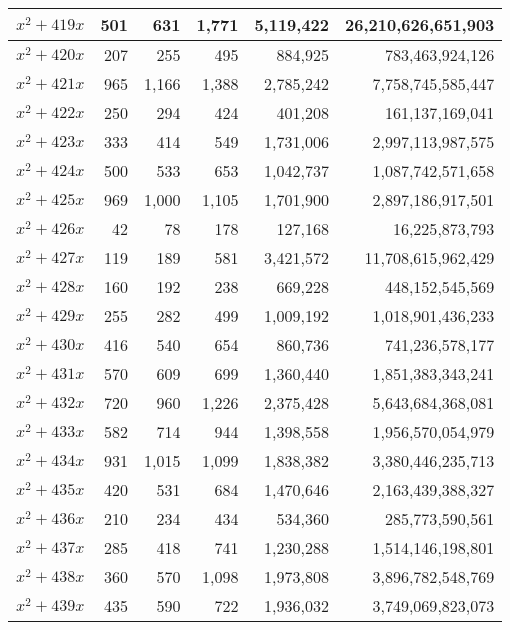 \documentclass[a4paper]{amsproc}
\theoremstyle{plain}
\begin{document}
\begin{longtable}{ | l | r | r | r | r | r | }
$x^2 + 419x$ & 501 & 631 & 1{,}771 & 5{,}119{,}422 & 26{,}210{,}626{,}651{,}903 \\ \hline
$x^2 + 420x$ & 207 & 255 & 495 & 884{,}925 & 783{,}463{,}924{,}126 \\ \hline
$x^2 + 421x$ & 965 & 1{,}166 & 1{,}388 & 2{,}785{,}242 & 7{,}758{,}745{,}585{,}447 \\ \hline
$x^2 + 422x$ & 250 & 294 & 424 & 401{,}208 & 161{,}137{,}169{,}041 \\ \hline
$x^2 + 423x$ & 333 & 414 & 549 & 1{,}731{,}006 & 2{,}997{,}113{,}987{,}575 \\ \hline
$x^2 + 424x$ & 500 & 533 & 653 & 1{,}042{,}737 & 1{,}087{,}742{,}571{,}658 \\ \hline
$x^2 + 425x$ & 969 & 1{,}000 & 1{,}105 & 1{,}701{,}900 & 2{,}897{,}186{,}917{,}501 \\ \hline
$x^2 + 426x$ & 42 & 78 & 178 & 127{,}168 & 16{,}225{,}873{,}793 \\ \hline
$x^2 + 427x$ & 119 & 189 & 581 & 3{,}421{,}572 & 11{,}708{,}615{,}962{,}429 \\ \hline
$x^2 + 428x$ & 160 & 192 & 238 & 669{,}228 & 448{,}152{,}545{,}569 \\ \hline
$x^2 + 429x$ & 255 & 282 & 499 & 1{,}009{,}192 & 1{,}018{,}901{,}436{,}233 \\ \hline
$x^2 + 430x$ & 416 & 540 & 654 & 860{,}736 & 741{,}236{,}578{,}177 \\ \hline
$x^2 + 431x$ & 570 & 609 & 699 & 1{,}360{,}440 & 1{,}851{,}383{,}343{,}241 \\ \hline
$x^2 + 432x$ & 720 & 960 & 1{,}226 & 2{,}375{,}428 & 5{,}643{,}684{,}368{,}081 \\ \hline
$x^2 + 433x$ & 582 & 714 & 944 & 1{,}398{,}558 & 1{,}956{,}570{,}054{,}979 \\ \hline
$x^2 + 434x$ & 931 & 1{,}015 & 1{,}099 & 1{,}838{,}382 & 3{,}380{,}446{,}235{,}713 \\ \hline
$x^2 + 435x$ & 420 & 531 & 684 & 1{,}470{,}646 & 2{,}163{,}439{,}388{,}327 \\ \hline
$x^2 + 436x$ & 210 & 234 & 434 & 534{,}360 & 285{,}773{,}590{,}561 \\ \hline
$x^2 + 437x$ & 285 & 418 & 741 & 1{,}230{,}288 & 1{,}514{,}146{,}198{,}801 \\ \hline
$x^2 + 438x$ & 360 & 570 & 1{,}098 & 1{,}973{,}808 & 3{,}896{,}782{,}548{,}769 \\ \hline
$x^2 + 439x$ & 435 & 590 & 722 & 1{,}936{,}032 & 3{,}749{,}069{,}823{,}073 \\ \hline

\end{longtable}
\end{document}
